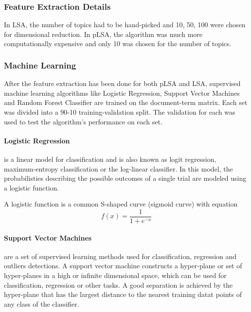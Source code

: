 \documentclass[12pt]{report}
\begin{document}
        \subsubsection{Feature Extraction Details}

            In LSA, the number of topics had to be hand-picked and 10, 50, 100 were chosen for dimensional reduction.
            In pLSA, the algorithm was much more computationally expensive and only 10 was chosen for the number of topics.



        \subsubsection{Machine Learning}
        After the feature extraction has been done for both pLSA and LSA, supervised machine learning algorithms like Logistic Regression, Support Vector Machines and Random Forest Classifier are trained
        on the document-term matrix. Each set was divided into a 90-10 training-validation split. The validation for each was used to test the algorithm's
        performance on each set.

        \paragraph{Logistic Regression}

        is a linear model for classification and is also known as logit regression, maximum-entropy
        classification or the log-linear classifier.
        In this model, the probabilisties describing the possible outcomes of a single trial are modeled using a logistic function.

        A logistic function is a common S-shaped curve (sigmoid curve) with equation
        \begin{equation}
            f(x) = \frac{1}{1+ e^{-x}}
        \end{equation}

        \paragraph{Support Vector Machines}


        are a set of supervised learning methods used for classification, regression and outliers detections.
        A support vector machine constructs a hyper-plane or set of hyper-planes in a high or infinite dimensional space, which can be used for classification,
        regression or other tasks. A good separation is achieved by the hyper-plane that has the largest distance to the nearest training datat points of any class of the classifier.
\end{document}

